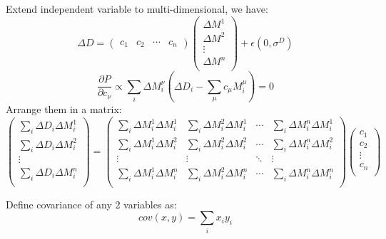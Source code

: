 Extend independent variable to multi-dimensional, we have:
\begin{equation}
    \Delta D = \begin{pmatrix} c_1 & c_2 & \cdots & c_n \end{pmatrix} 
	\begin{pmatrix}
	    \Delta M^1	\\
	    \Delta M^2	\\
	    \vdots 	\\
	    \Delta M^n	\\
	\end{pmatrix}
	+ \epsilon(0, \sigma^D)
\end{equation}
\begin{equation}
    \frac{\partial P}{\partial c_\nu} \propto \sum_i \Delta M_i^\nu (\Delta D_i - \sum_\mu c_\mu M_i^\mu) = 0
\end{equation}
Arrange them in a matrix:
\begin{equation}
    \begin{pmatrix}
	\sum_i \Delta D_i \Delta M_i^1 \\
	\sum_i \Delta D_i \Delta M_i^2 \\
	\vdots	\\
	\sum_i \Delta D_i \Delta M_i^n \\
    \end{pmatrix}
    = 
    \begin{pmatrix}
	\sum_i \Delta M_i^1 \Delta M_i^1    & \sum_i \Delta M_i^2 \Delta M_i^1	&
	\cdots	& \sum_i \Delta M_i^n \Delta M_i^1  \\
	\sum_i \Delta M_i^1 \Delta M_i^2    & \sum_i \Delta M_i^2 \Delta M_i^2	&
	\cdots	& \sum_i \Delta M_i^n \Delta M_i^2  \\
	\vdots	& \vdots    & \ddots	& \vdots    \\
	\sum_i \Delta M_i^1 \Delta M_i^n    & \sum_i \Delta M_i^2 \Delta M_i^n	&
	\cdots	& \sum_i \Delta M_i^n \Delta M_i^n  \\
    \end{pmatrix}
    \begin{pmatrix}
	c_1 \\
	c_2 \\
	\vdots	\\
	c_n \\ 
    \end{pmatrix}
\end{equation}

Define covariance of any 2 variables as:
\begin{equation}
    cov(x, y) = \sum_i x_i y_i
\end{equation}

